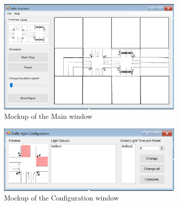 \begin{figure}[!ht]
	\caption{Mockup of the Main window}
	\label{fig:mainwindow}
	\centering
	\includegraphics[width=0.8\textwidth]{figures/MainForm}
\end{figure}
\begin{figure}[!ht]
	\caption{Mockup of the Configuration window}
	\label{fig:Configurationwindow}
	\centering
	\includegraphics[width=0.8\textwidth]{figures/configurationForm}
\end{figure}
